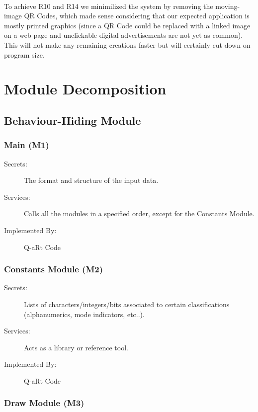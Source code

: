 \documentclass[12pt, titlepage]{article}
\begin{document}
\paragraph{}
To achieve R10 and R14 we minimilized the system by removing the moving-image QR 
Codes, which made sense considering that our expected application is mostly printed 
graphics (since a QR Code could be replaced with a linked image on a web page and 
unclickable digital advertisements are not yet as common). This will not make any 
remaining creations faster but will certainly cut down on program size.

\section{Module Decomposition} \label{SecMD}


\subsection{Behaviour-Hiding Module}

\subsubsection{Main (M1)}

\begin{description}
\item[Secrets:] The format and structure of the input data.
\item[Services:] Calls all the modules in a specified order, except for the Constants Module.
\item[Implemented By:] Q-aRt Code
\end{description}

\subsubsection{Constants Module (M2)}

\begin{description}
\item[Secrets:] Lists of characters/integers/bits associated to certain classifications (alphanumerics, mode indicators, etc..).
\item[Services:] Acts as a library or reference tool.
\item[Implemented By:] Q-aRt Code
\end{description}

\subsubsection{Draw Module (M3)}
\end{document}
